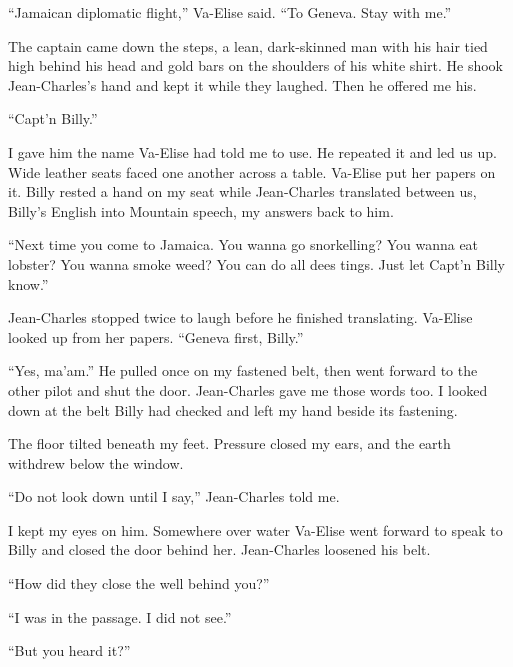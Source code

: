 ``Jamaican diplomatic flight,'' Va-Elise said. ``To Geneva. Stay with me.''\par

The captain came down the steps, a lean, dark-skinned man with his hair tied high behind his head and gold bars on the shoulders of his white shirt. He shook Jean-Charles's hand and kept it while they laughed. Then he offered me his.\par

``Capt'n Billy.''\par

I gave him the name Va-Elise had told me to use. He repeated it and led us up. Wide leather seats faced one another across a table. Va-Elise put her papers on it. Billy rested a hand on my seat while Jean-Charles translated between us, Billy's English into Mountain speech, my answers back to him.\par

``Next time you come to Jamaica. You wanna go snorkelling? You wanna eat lobster? You wanna smoke weed? You can do all dees tings. Just let Capt'n Billy know.''\par

Jean-Charles stopped twice to laugh before he finished translating. Va-Elise looked up from her papers. ``Geneva first, Billy.''\par

``Yes, ma'am.'' He pulled once on my fastened belt, then went forward to the other pilot and shut the door. Jean-Charles gave me those words too. I looked down at the belt Billy had checked and left my hand beside its fastening.\par

The floor tilted beneath my feet. Pressure closed my ears, and the earth withdrew below the window.\par

``Do not look down until I say,'' Jean-Charles told me.\par

I kept my eyes on him. Somewhere over water Va-Elise went forward to speak to Billy and closed the door behind her. Jean-Charles loosened his belt.\par

``How did they close the well behind you?''\par

``I was in the passage. I did not see.''\par

``But you heard it?''\par


